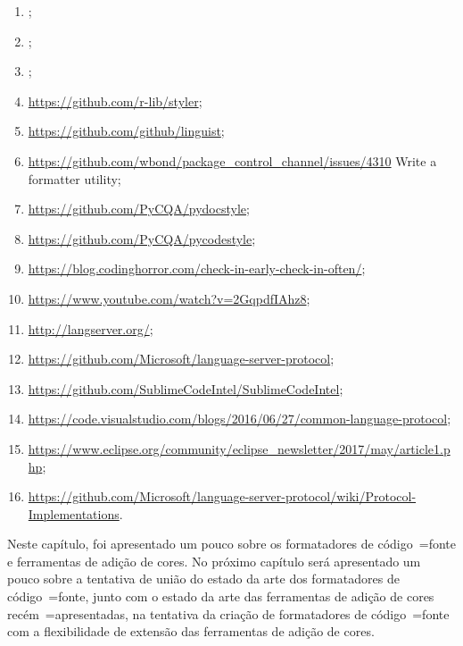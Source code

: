 {\begin{enumerate}
        \item {};
        \item {};
        \item {};
        \item \url{https://github.com/r-lib/styler};
        \item \url{https://github.com/github/linguist};
        \item \url{https://github.com/wbond/package_control_channel/issues/4310} Write a formatter utility;
        \item \url{https://github.com/PyCQA/pydocstyle};
        \item \url{https://github.com/PyCQA/pycodestyle};
        \item \url{https://blog.codinghorror.com/check-in-early-check-in-often/};
        \item \url{https://www.youtube.com/watch?v=2GqpdfIAhz8};
        \item \url{http://langserver.org/};
        \item \url{https://github.com/Microsoft/language-server-protocol};
        \item \url{https://github.com/SublimeCodeIntel/SublimeCodeIntel};
        \item \url{https://code.visualstudio.com/blogs/2016/06/27/common-language-protocol};
        \item \url{https://www.eclipse.org/community/eclipse_newsletter/2017/may/article1.php};
        \item \url{https://github.com/Microsoft/language-server-protocol/wiki/Protocol-Implementations}.
    \end{enumerate}
}

Neste capítulo,
foi apresentado um pouco sobre os formatadores de código~=fonte e
ferramentas de adição de cores.
No próximo capítulo será apresentado um pouco sobre a tentativa de união do estado da arte dos formatadores de código~=fonte,
junto com o estado da arte das ferramentas de adição de cores recém~=apresentadas,
na tentativa da criação de formatadores de código~=fonte com a flexibilidade de extensão das ferramentas de adição de cores.
